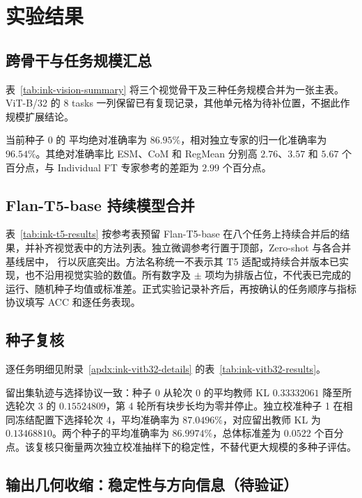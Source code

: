 \section{实验结果}
\label{sec:ink-results}

\subsection{跨骨干与任务规模汇总}



表~\ref{tab:ink-vision-summary} 将三个视觉骨干及三种任务规模合并为一张主表。ViT-B/32 的 8 tasks 一列保留已有复现记录，其他单元格为待补位置，不据此作规模扩展结论。

当前种子 0 的 \method{} 平均绝对准确率为 $86.95\%$，相对独立专家的归一化准确率为 $96.54\%$。其绝对准确率比 ESM、CoM 和 RegMean 分别高 $2.76$、$3.57$ 和 $5.67$ 个百分点，与 Individual FT 专家参考的差距为 $2.99$ 个百分点。

\FloatBarrier
\subsection{Flan-T5-base 持续模型合并}



表~\ref{tab:ink-t5-results} 按参考表预留 Flan-T5-base 在八个任务上持续合并后的结果，并补齐视觉表中的方法列表。独立微调参考行置于顶部，Zero-shot 与各合并基线居中，\method{} 行以灰底突出。方法名称统一不表示其 T5 适配或持续合并版本已实现，也不沿用视觉实验的数值。所有数字及 $\pm$ 项均为排版占位，不代表已完成的运行、随机种子均值或标准差。正式实验记录补齐后，再按确认的任务顺序与指标协议填写 ACC 和逐任务表现。

\FloatBarrier
\subsection{种子复核}

逐任务明细见附录~\ref{apdx:ink-vitb32-details} 的表~\ref{tab:ink-vitb32-results}。

留出集轨迹与选择协议一致：种子 0 从轮次 0 的平均教师 KL $0.33332061$ 降至所选轮次 3 的 $0.15524809$，第 4 轮所有块步长均为零并停止。独立校准种子 1 在相同冻结配置下选择轮次 4，平均准确率为 $87.0496\%$，对应留出教师 KL 为 $0.13468810$。两个种子的平均准确率为 $86.9974\%$，总体标准差为 $0.0522$ 个百分点。该复核只衡量两次独立校准抽样下的稳定性，不替代更大规模的多种子评估。
\FloatBarrier

\subsection{输出几何收缩：稳定性与方向信息（待验证）}
\label{sec:ink-parameter-analysis}

